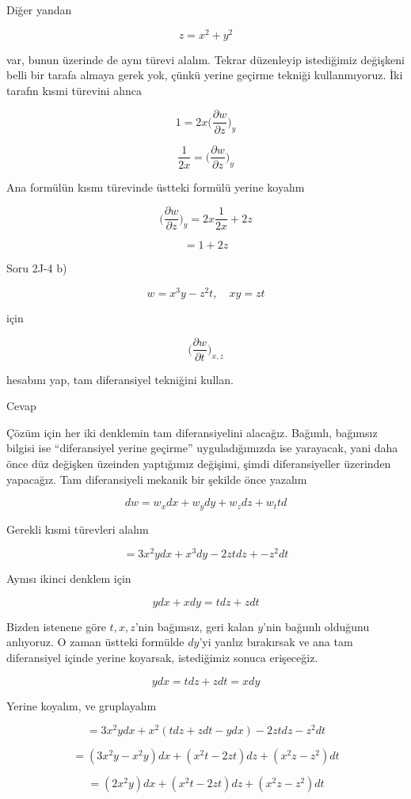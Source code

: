 \documentclass[12pt,fleqn]{article}\usepackage{../../common}
\begin{document}
Diğer yandan 

$$ z = x^2 + y^2 $$

var, bunun üzerinde de aynı türevi alalım. Tekrar düzenleyip istediğimiz
değişkeni belli bir tarafa almaya gerek yok, çünkü yerine geçirme tekniği
kullanmıyoruz. İki tarafın kısmi türevini alınca

$$ 1 = 2x  \bigg( \frac{\partial w}{\partial z}  \bigg)_y  $$

$$ \frac{ 1}{2x}  = \bigg( \frac{\partial w}{\partial z}  \bigg)_y  $$

Ana formülün kısmı türevinde üstteki formülü yerine koyalım

$$
\bigg( \frac{\partial w}{\partial z}  \bigg)_y  =
2x  \frac{1}{2x}  + 2z
$$

$$   =
1 + 2z
$$

Soru 2J-4 b)

$$ w = x^3y - z^2t, \quad xy = zt$$

için

$$ \bigg( \frac{\partial w}{\partial t}  \bigg)_{x,z}  $$

hesabını yap, tam diferansiyel tekniğini kullan. 

Cevap

Çözüm için her iki denklemin tam diferansiyelini alacağız. Bağımlı,
bağımsız bilgisi ise ``diferansiyel yerine geçirme'' uyguladığımızda ise
yarayacak, yani daha önce düz değişken üzeinden yaptığımız değişimi, şimdi
diferansiyeller üzerinden yapacağız. Tam diferansiyeli mekanik bir şekilde
önce yazalım

$$ dw = w_x dx + w_y dy + w_z dz + w_t td $$

Gerekli kısmi türevleri alalım

$$ = 3x^2y dx + x^3dy - 2zt dz + -z^2 dt$$

Aynısı ikinci denklem için 

$$ y dx + x dy = t dz + z dt $$

Bizden istenene göre $t,x,z$'nin bağımsız, geri kalan $y$'nin bağımlı
olduğunu anlıyoruz. O zaman üstteki formülde $dy$'yi yanlız bırakırsak ve
ana tam diferansiyel içinde yerine koyarsak, istediğimiz sonuca
erişeceğiz. 

$$ y dx  = t dz + z dt = x dy$$

Yerine koyalım, ve gruplayalım

$$ = 3x^2ydx + x^2(tdz + zdt - ydx) - 2ztdz - z^2dt $$

$$ = (3x^2y  - x^2y)dx + (x^2t-2zt)dz + (x^2z-z^2)dt  $$

$$ = (2x^2y) dx + (x^2t-2zt) dz + (x^2z-z^2)dt  $$
\end{document}
